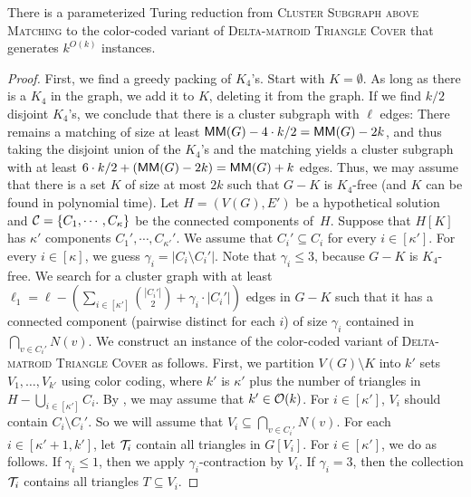 \begin{lemma} \label{lemma:lifting}
  There is a parameterized Turing reduction from \textsc{Cluster Subgraph above Matching} to the color-coded variant of \textsc{Delta-matroid Triangle Cover} that generates $k^{O(k)}$ instances.
\end{lemma}
\begin{proof}
  First, we find a greedy packing of $K_4$'s.
  Start with $K = \emptyset$.
  As long as there is a $K_4$ in the graph, we add it to $K$, deleting it from the graph. 
  If we find $k/2$ disjoint $K_4$'s, we conclude that there is a cluster subgraph with $\ell$ edges:
  There remains a matching of size at least $\mathsf{MM}(G) - 4 \cdot k/2 = \mathsf{MM}(G) - 2k$, and thus taking the disjoint union of the $K_4$'s and the matching yields a cluster subgraph with at least $6 \cdot k/2 + (\mathsf{MM}(G) - 2k) = \mathsf{MM}(G) + k$ edges.
  Thus, we may assume that there is a set $K$ of size at most $2k$ such that $G - K$ is $K_4$-free (and $K$ can be found in polynomial time).
  Let $H = (V(G), E')$ be a hypothetical solution and $\mathcal C = \{ C_1, \cdots, C_{\kappa} \}$ be the connected components of~$H$.
  Suppose that $H[K]$ has $\kappa'$ components $C_1', \cdots, C_{\kappa'}'$. We assume that $C_i' \subseteq C_i$ for every $i \in [\kappa']$.
  For every $i \in [\kappa]$, we guess $\gamma_i = |C_i \setminus C_i'|$.
  Note that $\gamma_i \le 3$, because $G - K$ is $K_4$-free.
  We search for a cluster graph with at least $\ell_1 = \ell - (\sum_{i \in [\kappa']} \binom{|C_i'|}{2} + \gamma_{i} \cdot |C_i'|)$ edges in $G - K$ such that it has a connected component (pairwise distinct for each $i$) of size $\gamma_i$ contained in $\bigcap_{v \in C_i'} N(v)$.
  We construct an instance of the color-coded variant of \textsc{Delta-matroid Triangle Cover} as follows.
  First, we partition $V(G) \setminus K$ into $k'$ sets $V_1, \dots, V_{k'}$ using color coding, where $k'$ is $\kappa'$ plus the number of triangles in $H - \bigcup_{i \in [\kappa']} C_i$.
  By , we may assume that $k' \in \mathcal{O}(k)$.
  For $i \in [\kappa']$, $V_i$ should contain $C_i \setminus C_i'$.
  So we will assume that $V_i \subseteq \bigcap_{v \in C_i'} N(v)$.
  For each $i \in [\kappa' + 1, k']$, let $\mathcal T_i$ contain all triangles in $G[V_i]$.
  For $i \in [\kappa']$, we do as follows.
  If $\gamma_i \le 1$, then we apply $\gamma_i$-contraction by $V_i$.
  If $\gamma_i = 3$, then the collection $\mathcal T_i$ contains all triangles $T \subseteq V_i$.

\end{proof}
